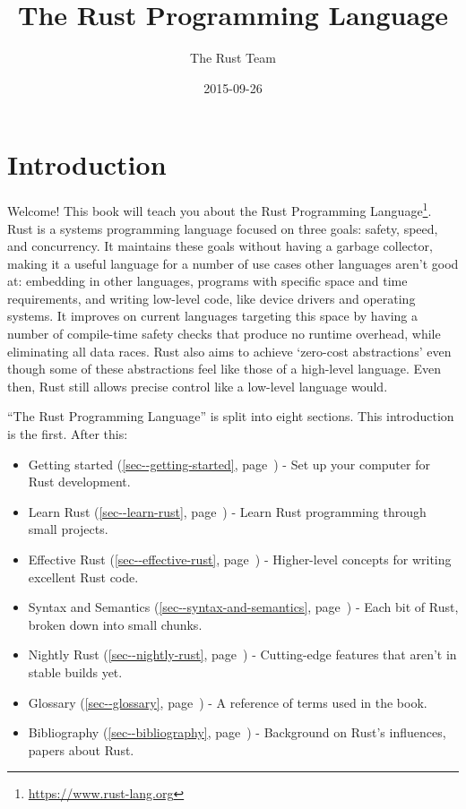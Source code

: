 \documentclass[a4paper,]{book}
\title{The Rust Programming Language}
\author{The Rust Team}
\date{2015-09-26}
\renewcommand*{\hyperref}[2][\ar]{%
  \def\ar{#2}%
  #2 (\autoref{#1}, page~\pageref{#1})}
\renewcommand{\href}[2]{#2\footnote{\url{#1}}}
\providecommand{\tightlist}{%
  \setlength{\itemsep}{0pt}\setlength{\parskip}{0pt}}
\begin{document}
  \maketitle



{
  \hypersetup{linkcolor=black}
  \setcounter{tocdepth}{2}
  \tableofcontents
  \newpage
}

\chapter{Introduction}\label{introduction}

Welcome! This book will teach you about the
\href{https://www.rust-lang.org}{Rust Programming Language}. Rust is a
systems programming language focused on three goals: safety, speed, and
concurrency. It maintains these goals without having a garbage
collector, making it a useful language for a number of use cases other
languages aren't good at: embedding in other languages, programs with
specific space and time requirements, and writing low-level code, like
device drivers and operating systems. It improves on current languages
targeting this space by having a number of compile-time safety checks
that produce no runtime overhead, while eliminating all data races. Rust
also aims to achieve `zero-cost abstractions' even though some of these
abstractions feel like those of a high-level language. Even then, Rust
still allows precise control like a low-level language would.

``The Rust Programming Language'' is split into eight sections. This
introduction is the first. After this:

\begin{itemize}
\tightlist
\item
  \hyperref[sec--getting-started]{Getting started} - Set up your
  computer for Rust development.
\item
  \hyperref[sec--learn-rust]{Learn Rust} - Learn Rust programming
  through small projects.
\item
  \hyperref[sec--effective-rust]{Effective Rust} - Higher-level concepts
  for writing excellent Rust code.
\item
  \hyperref[sec--syntax-and-semantics]{Syntax and Semantics} - Each bit
  of Rust, broken down into small chunks.
\item
  \hyperref[sec--nightly-rust]{Nightly Rust} - Cutting-edge features
  that aren't in stable builds yet.
\item
  \hyperref[sec--glossary]{Glossary} - A reference of terms used in the
  book.
\item
  \hyperref[sec--bibliography]{Bibliography} - Background on Rust's
  influences, papers about Rust.
\end{itemize}
\end{document}
